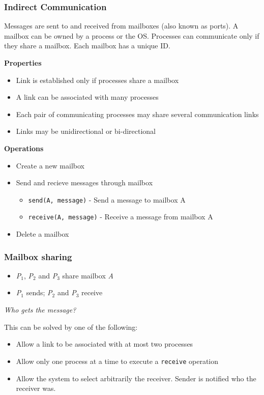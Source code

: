 \documentclass[]{article}
\begin{document}
\subsubsection*{Indirect Communication}

Messages are sent to and received from mailboxes (also known as ports). A mailbox can be owned by a process or the OS. Processes can communicate only if they share a mailbox. Each mailbox has a unique ID.

\textbf{Properties}
\begin{itemize}
    \item Link is established only if processes share a mailbox
    \item A link can be associated with many processes
    \item Each pair of communicating processes may share several communication links
    \item Links may be unidirectional or bi-directional
\end{itemize}

\textbf{Operations}
\begin{itemize}
    \item Create a new mailbox
    \item Send and recieve messages through mailbox
    \begin{itemize}
        \item \verb|send(A, message)| - Send a message to mailbox A
        \item \verb|receive(A, message)| - Receive a message from mailbox A
    \end{itemize}
    \item Delete a mailbox
\end{itemize}

\subsubsection*{Mailbox sharing}

\begin{itemize}
    \item \emph{P$_1$}, \emph{P$_2$} and \emph{P$_3$} share mailbox \emph{A}
    \item \emph{P$_1$} sends; \emph{P$_2$} and \emph{P$_3$} receive
\end{itemize}
\emph{Who gets the message?}

This can be solved by one of the following:
\begin{itemize}
    \item Allow a link to be associated with at most two processes
    \item Allow only one process at a time to execute a \verb|receive| operation
    \item Allow the system to select arbitrarily the receiver. Sender is notified who the receiver was.
\end{itemize}
\end{document}
